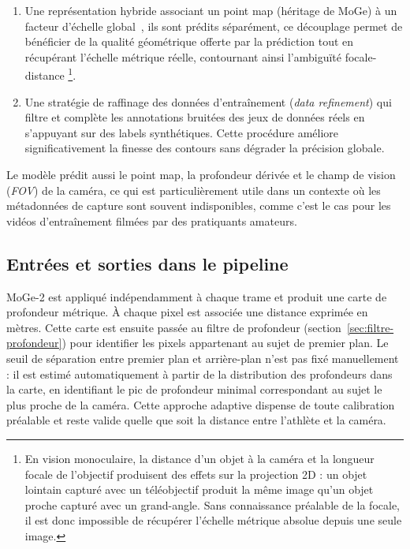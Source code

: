 \begin{enumerate}
  \item Une représentation hybride associant un point map (héritage de MoGe) à un facteur d'échelle global~\cite{MoGe-2025}, ils sont prédits séparément, ce découplage permet de bénéficier de la qualité géométrique offerte par la prédiction tout en récupérant l'échelle métrique réelle, contournant ainsi l'ambiguïté focale-distance \footnote{En vision monoculaire, la distance d'un objet à la caméra et la longueur focale de l'objectif produisent des effets sur la projection 2D : un objet lointain capturé avec un téléobjectif produit la même image qu'un objet proche capturé avec un grand-angle. Sans connaissance préalable de la focale, il est donc impossible de récupérer l'échelle métrique absolue depuis une seule image.}.
  \item Une stratégie de raffinage des données d'entraînement (\textit{data refinement}) qui filtre et complète les annotations bruitées des jeux de données réels en s'appuyant sur des labels synthétiques. Cette procédure améliore significativement la finesse des contours sans dégrader la précision globale.
\end{enumerate}

Le modèle prédit aussi le point map, la profondeur dérivée et le champ de vision (\textit{FOV}) de la caméra, ce qui est particulièrement utile dans un contexte où les métadonnées de capture sont souvent indisponibles, comme c'est le cas pour les vidéos d'entraînement filmées par des pratiquants amateurs.

\subsection{Entrées et sorties dans le pipeline}

MoGe-2 est appliqué indépendamment à chaque trame et produit une carte de profondeur métrique. À chaque pixel est associée une distance exprimée en mètres. Cette carte est ensuite passée au filtre de profondeur (section~\ref{sec:filtre-profondeur}) pour identifier les pixels appartenant au sujet de premier plan. Le seuil de séparation entre premier plan et arrière-plan n'est pas fixé manuellement : il est estimé automatiquement à partir de la distribution des profondeurs dans la carte, en identifiant le pic de profondeur minimal correspondant au sujet le plus proche de la caméra. Cette approche adaptive dispense de toute calibration préalable et reste valide quelle que soit la distance entre l'athlète et la caméra.

